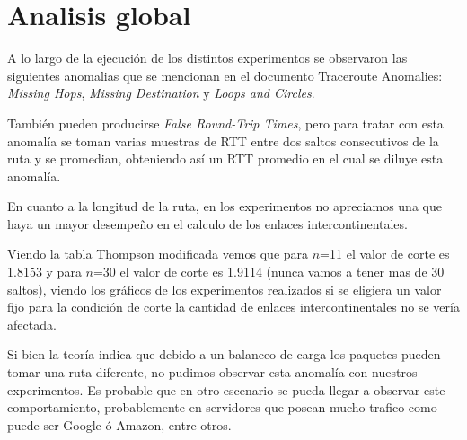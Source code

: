 \section{Analisis global}
A lo largo de la ejecución de los distintos experimentos se observaron las siguientes anomalias que se mencionan en el documento Traceroute Anomalies:
\emph{Missing Hops}, \emph{Missing Destination} y \emph{Loops and Circles}.

También pueden producirse \emph{False Round-Trip Times}, pero para tratar con esta anomalía se toman varias muestras de RTT entre dos saltos consecutivos de la ruta y se promedian, obteniendo así un RTT promedio en el cual se diluye esta anomalía.

En cuanto a la longitud de la ruta, en los experimentos no apreciamos una que haya un mayor desempeño en el calculo de los enlaces intercontinentales.

Viendo la tabla Thompson modificada vemos que para $n$=11 el valor de corte es 1.8153 y para $n$=30 el valor de corte es 1.9114 (nunca vamos a tener mas de 30 saltos), viendo los gráficos de los experimentos realizados si se eligiera un valor fijo para la condición de corte la cantidad de enlaces intercontinentales no se vería afectada. 

Si bien la teoría indica que debido a un balanceo de carga los paquetes pueden tomar una ruta diferente, no pudimos observar esta anomalía
con nuestros experimentos. Es probable que en otro escenario se pueda llegar a observar	este comportamiento, probablemente en servidores
que posean mucho trafico como puede ser Google ó Amazon, entre otros.
